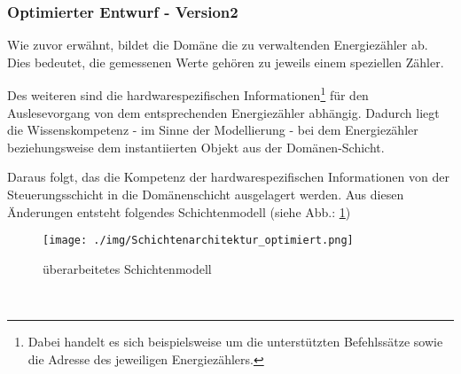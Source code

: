 \documentclass[Bachelorarbeit.tex]{subfiles}
\begin{document}
\subsubsection*{Optimierter Entwurf - Version2}
\begin{comment}
Der zentrale Ansatz muss nicht vollständig verworfen werden, allerdings sollten gewisse Stellen 
überarbeitet werden. \\
\end{comment}
Wie zuvor erwähnt, bildet die Domäne die zu verwaltenden Energiezähler ab. 
Dies bedeutet, die gemessenen Werte gehören zu jeweils einem speziellen Zähler. 
\begin{comment}
Die hardwarespezifischen Information für den Auslesevorgang, wie zum Beispiel über welche Adresse oder 
welche Befehlssätze der Zähler verfügt, besitzt jeder Energiezähler selbst.
\end{comment}
Des weiteren sind die hardwarespezifischen Informationen\footnote{Dabei handelt es sich beispielsweise um die unterstützten Befehlssätze sowie die Adresse des jeweiligen Energiezählers.} für den Auslesevorgang von dem entsprechenden Energiezähler abhängig.
Dadurch liegt die Wissenskompetenz - im Sinne der Modellierung - bei dem Energiezähler beziehungsweise dem instantiierten Objekt aus der Domänen-Schicht. 
\begin{comment}
Von dieser Annahme ausgehend, wäre es sinnvoll – sowie der Kohäsion dienlich – wenn ein Energiezähler (Instanziierung eines \\
Domänenobjektes) selbst über einen eigenen geräte-spezifischen Befehlssatz und die entsprechenden Verbindungsinformationen verfügt.
\end{comment}
Daraus folgt, das die Kompetenz der hardwarespezifischen Informationen von der Steuerungsschicht in die Domänenschicht ausgelagert werden. 
Aus diesen Änderungen entsteht folgendes Schichtenmodell (siehe Abb.: \ref{pic:schicht_optimiert})\\
\begin{figure}[t]
\texttt{[image: ./img/Schichtenarchitektur\_optimiert.png]}
\caption{überarbeitetes Schichtenmodell}
\label{pic:schicht_optimiert}
\end{figure}
\\
\begin{comment}
Die neue Version des Modells (siehe Abb.: \ref{pic:schicht_optimiert}) weist nun die Eigenschaften von 
einseitigen Abhängigkeiten zwischen den Schichten sowie einer realisierten 
Zugriffsvirtualisierung auf.
 Das überarbeitete Modell kann dem Konzept der 
Schichtenarchitektur zugeordnet werden.
\end{comment}
\end{document}
